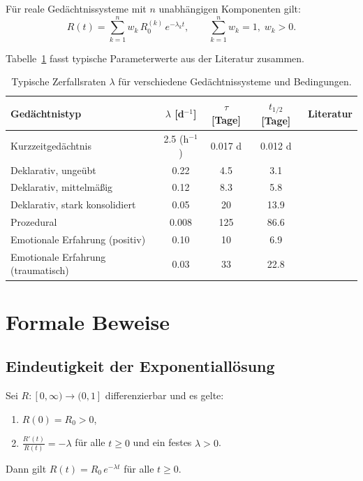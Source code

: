 ﻿\documentclass[12pt,a4paper,twoside]{article}
\theoremstyle{theormstyle}
\theoremstyle{proofstyle}
\begin{document}
	Für reale Gedächtnissysteme mit $n$ unabhängigen Komponenten gilt:
	\begin{equation}
		R(t) = \sum_{k=1}^{n} w_k\,R_0^{(k)}\,e^{-\lambda_k t},
		\qquad \sum_{k=1}^{n} w_k = 1,\; w_k > 0.
		\label{eq:multiexp}
	\end{equation}
	
	Tabelle~\ref{tab:parameter} fasst typische Parameterwerte aus der Literatur zusammen.
	
	\begin{table}
		\centering
		\caption{Typische Zerfallsraten $\lambda$ für verschiedene Gedächtnissysteme und Bedingungen.}
		\label{tab:parameter}
		\begin{tabular}{lcccc}
			\toprule
			Gedächtnistyp & $\lambda$ [d$^{-1}$] & $\tau$ [Tage] & $t_{1/2}$ [Tage] & Literatur \\
			\midrule
			Kurzzeitgedächtnis & 2.5 \quad(h$^{-1}$) & 0.017 d & 0.012 d & \cite{atkinson1968human} \\
			Deklarativ, ungeübt & 0.22 & 4.5 & 3.1 & \cite{ebbinghaus1885} \\
			Deklarativ, mittelmäßig & 0.12 & 8.3 & 5.8 & \cite{murre2015replication} \\
			Deklarativ, stark konsolidiert & 0.05 & 20 & 13.9 & \cite{wixted2004psychology} \\
			Prozedural & 0.008 & 125 & 86.6 & \cite{squire1992memory} \\
			Emotionale Erfahrung (positiv) & 0.10 & 10 & 6.9 & \cite{cahill1995amygdala} \\
			Emotionale Erfahrung (traumatisch) & 0.03 & 33 & 22.8 & \cite{mcgaugh2000memory} \\
			\bottomrule
		\end{tabular}
	\end{table}
	
	\section{Formale Beweise}
	\label{sec:beweise}
	
	\subsection{Eindeutigkeit der Exponentiallösung}
	
		Sei $R : [0,\infty) \to (0,1]$ differenzierbar und es gelte:
		\begin{enumerate}[label=(\alph*)]
			\item $R(0) = R_0 > 0$,
			\item $\displaystyle\frac{R'(t)}{R(t)} = -\lambda$ für alle $t \geq 0$ und ein
			festes $\lambda > 0$.
		\end{enumerate}
		Dann gilt $R(t) = R_0\,e^{-\lambda t}$ für alle $t \geq 0$.
	
\end{document}
